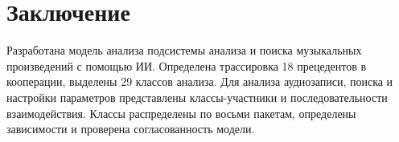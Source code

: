 \section{Заключение}

Разработана модель анализа подсистемы анализа и поиска музыкальных
произведений с помощью ИИ. Определена трассировка 18 прецедентов
в кооперации, выделены 29 классов анализа. Для анализа аудиозаписи,
поиска и настройки параметров представлены классы-участники
и последовательности взаимодействия. Классы распределены по восьми
пакетам, определены зависимости и проверена согласованность модели.

